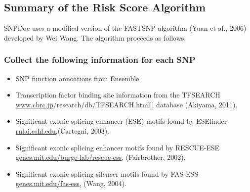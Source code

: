 \documentclass[11pt]{article}
\begin{document}
\subsection{Summary of the Risk Score Algorithm}
\label{sec-3_4}


   SNPDoc uses a modified version of the FASTSNP algorithm (Yuan et al., 2006)
   developed by Wei Wang.  The algorithm proceeds as follows.
\subsubsection{Collect the following information for each SNP}
\label{sec-3_4_1}


\begin{itemize}
\item SNP function annoations from Ensemble
\item Transcription factor binding site information from the TFSEARCH
      \hyperref[[[www.cbrc.jp]{www.cbrc.jp}/research/db/TFSEARCH.html]] database (Akiyama, 2011).
\item Significant exonic splicing enhancer (ESE) motifs found by ESEfinder
      \hyperref[rulai.cshl.edu]{rulai.cshl.edu},(Cartegni, 2003).
\item Significant exonic splicing enhancer motifs found by RESCUE-ESE
      \hyperref[genes.mit.edu/burge-lab/rescue-ess]{genes.mit.edu/burge-lab/rescue-ess}, (Fairbrother, 2002).
\item Significant exonic splicing silencer motifs found by FAS-ESS
      \hyperref[genes.mit.edu/fas-ess]{genes.mit.edu/fas-ess}, (Wang, 2004).
\end{itemize}
\end{document}
